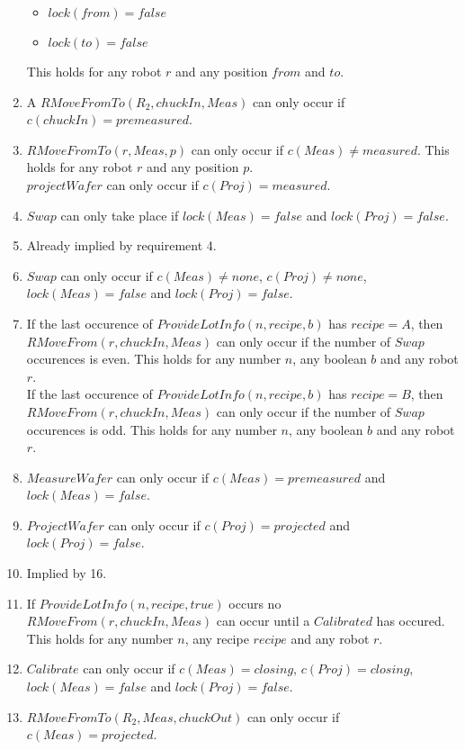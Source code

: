 \begin{enumerate}
\begin{itemize}
	\item $lock(from)= false$
	\item $lock(to) = false$
	\end{itemize}
	This holds for any robot $r$ and any position $from$ and $to$.
	\item A $RMoveFromTo(R_2,chuckIn,Meas)$ can only occur if $c(chuckIn) = premeasured$.
	\item $RMoveFromTo(r, Meas, p)$ can only occur if $c(Meas) \neq measured$. This holds for any robot $r$ and any position $p$.\\
	$projectWafer$ can only occur if $c(Proj) = measured$.
	\item $Swap$ can only take place if $lock(Meas) = false$ and $lock(Proj) = false$.
	\item Already implied by requirement 4.
	\item $Swap$ can only occur if $c(Meas) \neq none$, $c(Proj) \neq none$, $lock(Meas) =false$ and $lock(Proj) = false$.
	\item If the last occurence of $ProvideLotInfo(n,recipe,b)$ has $recipe=A$, then $RMoveFrom(r,chuckIn,Meas)$ can only occur if the number of $Swap$ occurences is even. This holds for any number $n$, any boolean $b$ and any robot $r$.\\
	If the last occurence of $ProvideLotInfo(n,recipe,b)$ has $recipe=B$, then $RMoveFrom(r,chuckIn,Meas)$ can only occur if the number of $Swap$ occurences is odd. This holds for any number $n$, any boolean $b$ and any robot $r$.\\
	\item $MeasureWafer$ can only occur if $c(Meas) = premeasured$ and $lock(Meas) = false$.
	\item $ProjectWafer$ can only occur if $c(Proj) = projected$ and $lock(Proj) = false$.
	\item Implied by 16.
	\item If $ProvideLotInfo(n,recipe,true)$ occurs no $RMoveFrom(r,chuckIn,Meas)$ can occur until a $Calibrated$ has occured. This holds for any number $n$, any recipe $recipe$ and any robot $r$.
	\item $Calibrate$ can only occur if $c(Meas) = closing$, $c(Proj) = closing$, $lock(Meas) = false$ and $lock(Proj) = false$.
	\item $RMoveFromTo(R_2, Meas, chuckOut)$ can only occur if $c(Meas) = projected$.
\end{enumerate}
